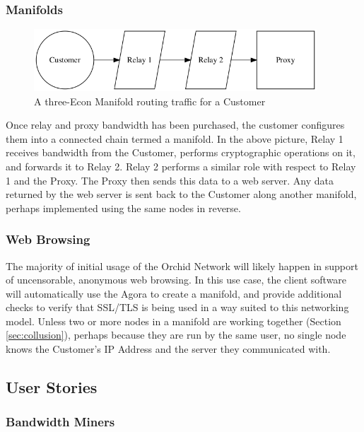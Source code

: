 \documentclass{article}
\newcommand{\mesh}{Orchid}
\begin{document}
\subsubsection{Manifolds}

\begin{figure}[htbp]
  \centering
  \includegraphics[width = 300pt]{sttc}
  \caption{A three-Econ Manifold routing traffic for a Customer}
\end{figure}

Once relay and proxy bandwidth has been purchased, the customer configures them into a connected chain termed a manifold. In the above picture, Relay 1 receives bandwidth from the Customer, performs cryptographic operations on it, and forwards it to Relay 2. Relay 2 performs a similar role with respect to Relay 1 and the Proxy. The Proxy then sends this data to a web server. Any data returned by the web server is sent back to the Customer along another manifold, perhaps implemented using the same nodes in reverse.

\subsubsection{Web Browsing}

The majority of initial usage of the \mesh{} Network will likely happen in support of uncensorable, anonymous web browsing. In this use case, the client software will automatically use the Agora to create a manifold, and provide additional checks to verify that SSL/TLS is being used in a way suited to this networking model. Unless two or more nodes in a manifold are working together (Section \ref{sec:collusion}), perhaps because they are run by the same user, no single node knows the Customer's IP Address and the server they communicated with.

\subsection{User Stories}

\subsubsection{Bandwidth Miners}
\end{document}
